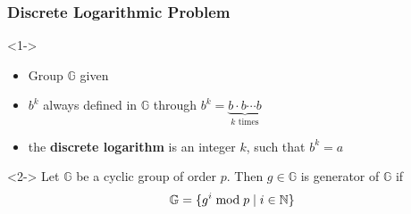 \begin{frame}
	\frametitle{Discrete Logarithmic Problem}

	\begin{definition}<1->
		\begin{itemize}
			\item Group $\mathbb{G}$ given
			\item $b^k$ always defined in $\mathbb{G}$ through $b^k = \underbrace{b\cdot b \cdots b}_{k\text{ times}}$
			\item the \textbf{discrete logarithm} is an integer $k$, such that $b^k = a$
		\end{itemize}
	\end{definition}
	\begin{definition}<2->
		Let $\mathbb{G}$ be a cyclic group of order $p$. Then $g\in\mathbb{G}$ is generator of $\mathbb{G}$ if
			$$\mathbb{G} = \{g^i \bmod p \mid i \in \mathbb{N} \}$$
	\end{definition}
\end{frame}

